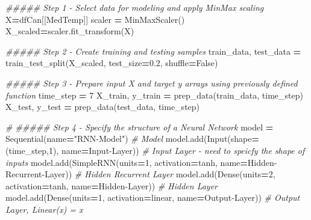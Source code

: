 \documentclass[
  a4paper,
  DIV=11,
  numbers=noendperiod]{scrreprt}
\newenvironment{Shaded}{\begin{snugshade}}{\end{snugshade}}
\newcommand{\CommentTok}[1]{\textcolor[rgb]{0.56,0.35,0.01}{\textit{#1}}}
\newcommand{\DecValTok}[1]{\textcolor[rgb]{0.00,0.00,0.81}{#1}}
\newcommand{\FloatTok}[1]{\textcolor[rgb]{0.00,0.00,0.81}{#1}}
\newcommand{\NormalTok}[1]{#1}
\newcommand{\OperatorTok}[1]{\textcolor[rgb]{0.81,0.36,0.00}{\textbf{#1}}}
\newcommand{\StringTok}[1]{\textcolor[rgb]{0.31,0.60,0.02}{#1}}
\newcommand{\VariableTok}[1]{\textcolor[rgb]{0.00,0.00,0.00}{#1}}
\begin{document}
\begin{Shaded}
\begin{Highlighting}[numbers=left,,]

\CommentTok{\#\#\#\#\# Step 1 {-} Select data for modeling and apply MinMax scaling}
\NormalTok{X}\OperatorTok{=}\NormalTok{dfCan[[}\StringTok{\textquotesingle{}MedTemp\textquotesingle{}}\NormalTok{]]}
\NormalTok{scaler }\OperatorTok{=}\NormalTok{ MinMaxScaler()}
\NormalTok{X\_scaled}\OperatorTok{=}\NormalTok{scaler.fit\_transform(X)}


\CommentTok{\#\#\#\#\# Step 2 {-} Create training and testing samples}
\NormalTok{train\_data, test\_data }\OperatorTok{=}\NormalTok{ train\_test\_split(X\_scaled, test\_size}\OperatorTok{=}\FloatTok{0.2}\NormalTok{, shuffle}\OperatorTok{=}\VariableTok{False}\NormalTok{)}


\CommentTok{\#\#\#\#\# Step 3 {-} Prepare input X and target y arrays using previously defined function}
\NormalTok{time\_step }\OperatorTok{=} \DecValTok{7}
\NormalTok{X\_train, y\_train }\OperatorTok{=}\NormalTok{ prep\_data(train\_data, time\_step)}
\NormalTok{X\_test, y\_test }\OperatorTok{=}\NormalTok{ prep\_data(test\_data, time\_step)}

\CommentTok{\# \#\#\#\#\# Step 4 {-} Specify the structure of a Neural Network}
\NormalTok{model }\OperatorTok{=}\NormalTok{ Sequential(name}\OperatorTok{=}\StringTok{"RNN{-}Model"}\NormalTok{) }\CommentTok{\# Model}
\NormalTok{model.add(Input(shape}\OperatorTok{=}\NormalTok{(time\_step,}\DecValTok{1}\NormalTok{), name}\OperatorTok{=}\StringTok{\textquotesingle{}Input{-}Layer\textquotesingle{}}\NormalTok{)) }\CommentTok{\# Input Layer {-} need to speicfy the shape of inputs}
\NormalTok{model.add(SimpleRNN(units}\OperatorTok{=}\DecValTok{1}\NormalTok{, activation}\OperatorTok{=}\StringTok{\textquotesingle{}tanh\textquotesingle{}}\NormalTok{, name}\OperatorTok{=}\StringTok{\textquotesingle{}Hidden{-}Recurrent{-}Layer\textquotesingle{}}\NormalTok{)) }\CommentTok{\# Hidden Recurrent Layer}
\NormalTok{model.add(Dense(units}\OperatorTok{=}\DecValTok{2}\NormalTok{, activation}\OperatorTok{=}\StringTok{\textquotesingle{}tanh\textquotesingle{}}\NormalTok{, name}\OperatorTok{=}\StringTok{\textquotesingle{}Hidden{-}Layer\textquotesingle{}}\NormalTok{)) }\CommentTok{\# Hidden Layer}
\NormalTok{model.add(Dense(units}\OperatorTok{=}\DecValTok{1}\NormalTok{, activation}\OperatorTok{=}\StringTok{\textquotesingle{}linear\textquotesingle{}}\NormalTok{, name}\OperatorTok{=}\StringTok{\textquotesingle{}Output{-}Layer\textquotesingle{}}\NormalTok{)) }\CommentTok{\# Output Layer, Linear(x) = x}



\end{Highlighting}
\end{Shaded}
\end{document}

